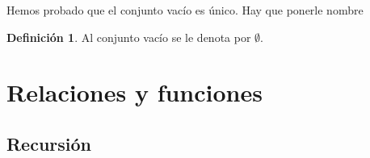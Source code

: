 \documentclass{book}
\theoremstyle{definition}
\newtheorem{df}{Definición}[chapter]
\begin{document}
Hemos probado que el conjunto vacío es único. Hay que ponerle nombre
\begin{df}
	Al conjunto vacío se le denota por $\emptyset$.
\end{df}






\chapter{Relaciones y funciones}
\label{ch_funciones}
















\section{Recursión}
	




\end{document}
